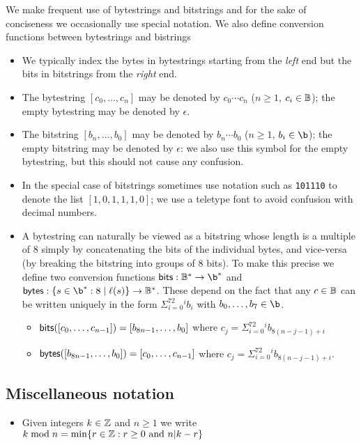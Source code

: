 We make frequent use of bytestrings and bitstrings and for the sake of
conciseness we occasionally use special notation.  We also define conversion
functions between bytestrings and bistrings

\begin{itemize}
\item We typically index the bytes in bytestrings starting from the
  \textit{left} end but the bits in bitstrings from the \textit{right} end.

\item The bytestring $[c_0, \ldots, c_n]$ may be denoted by $c_0{\cdots}c_n$ ($n
  \geq 1$, $c_i \in \mathbb{B}$);  the empty bytestring may be denoted by $\epsilon$.

\item The bitstring $[b_n, \ldots, b_0]$ may be denoted by $b_n{\cdots}b_0$ ($n
  \geq 1$, $b_i \in \b$); the empty bitstring may be denoted by $\epsilon$: we
  also use this symbol for the empty bytestring, but this should not cause any
  confusion.

\item In the special case of bitstrings sometimes use notation such as
  \texttt{101110} to denote the list $[1,0,1,1,1,0]$; we use a teletype font to
  avoid confusion with decimal numbers.
  
\item A bytestring can naturally be viewed as a bitstring whose length is a
  multiple of 8 simply by concatenating the bits of the individual bytes, and
  vice-versa (by breaking the bitstring into groups of 8 bits).  To make this
  precise we define two conversion functions $\bitsof: \B^* \rightarrow \b^*$
  and $\bytesof: \{s \in \b^* : 8 \mid \length(s)\} \rightarrow \B^*$.  These
  depend on the fact that any $c \in \mathbb{B}$ can be written uniquely in the form
  $\Sigma_{i=0}^72^ib_i$ with $b_0, \ldots, b_7 \in \b$.
  \begin{itemize}
    \item $\mathsf{bits}([c_0, \ldots, c_{n-1}]) = [b_{8n-1}, \ldots, b_0]$ where $c_j=\Sigma_{i=0}^72^ib_{8(n-j-1)+i}$
    \item $\mathsf{bytes}([b_{8n-1}, \ldots, b_0]) = [c_0, \ldots, c_{n-1}]$ where $c_j=\Sigma_{i=0}^72^ib_{8(n-j-1)+i}$.
  \end{itemize}
\end{itemize}

\subsection{Miscellaneous notation}
\begin{itemize}
\item Given integers $k \in \mathbb{Z}$ and $n \geq 1$ we write $k \bmod n = \min\{r \in \mathbb{Z}: r \geq 0 \text{ and } n | k - r \}$
\end{itemize}


